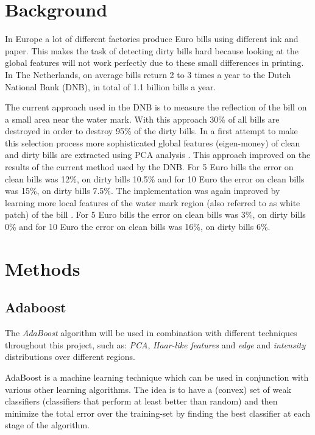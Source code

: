 \documentclass[11pt,twocolumn]{article}
\begin{document}
	\section{Background}\label{sec:Background}
		In Europe a lot of different factories produce Euro bills using different ink and paper. This makes the task of detecting dirty bills hard because looking at the global features will not work perfectly due to these small differences in printing. In The Netherlands, on average bills return 2 to 3 times a year to the Dutch National Bank (DNB), in total of 1.1 billion bills a year. 

		The current approach used in the DNB is to measure the reflection of the bill on a small area near the water mark. With this approach 30\% of all bills are destroyed in order to destroy 95\% of the dirty bills. In a first attempt to make this selection process more sophisticated global features (eigen-money) of clean and dirty bills are extracted using PCA analysis \cite{MoNuSt}. This approach improved on the results of the current method used by the DNB. For 5 Euro bills the error on clean bills was 12\%, on dirty bills 10.5\% and for 10 Euro the error on clean bills was 15\%, on dirty bills 7.5\%.  The implementation was again improved by learning more local features of the water mark region (also referred to as white patch) of the bill \cite{Geusebroek}.  For 5 Euro bills the error on clean bills was 3\%, on dirty bills 0\% and for 10 Euro the error on clean bills was 16\%, on dirty bills 6\%.
	\section{Methods}\label{sec:Methods}
		\subsection{Adaboost}\label{sec:Adaboost}
			The \emph{AdaBoost} algorithm will be used in combination with different techniques throughout this project, such as: \emph{PCA}, \emph{Haar-like features} and \emph{edge} and \emph{intensity} distributions over different regions.

AdaBoost is a machine learning technique which can be used in conjunction with various other learning algorithms. The idea is to have a (convex) set of weak classifiers (classifiers that perform at least better than random) and then minimize the total error over the training-set by finding the best classifier at each stage of the algorithm.
\end{document}
